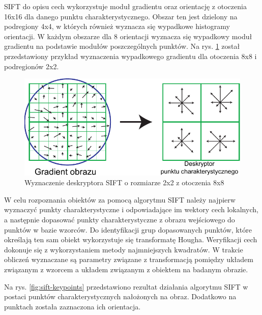 SIFT do opisu cech wykorzystuje moduł gradientu oraz orientację z otoczenia 16x16 dla danego punktu charakterystycznego. Obszar ten jest dzielony na podregiony 4x4, w których również wyznacza się wypadkowe histogramy orientacji. W każdym obszarze dla 8 orientacji wyznacza się wypadkowy moduł gradientu na podstawie modułów poszczególnych punktów. Na rys. \ref{fig:sift-descriptor} został przedstawiony przykład wyznaczenia wypadkowego gradientu dla otoczenia 8x8 i podregionów 2x2.

\begin{figure}[h]
	\centering
	\includegraphics[scale=1]{graphics/01_podstawy_teoretyczne/sift-descriptor.pdf}
	\caption{Wyznaczenie deskryptora SIFT o rozmiarze 2x2 z otoczenia 8x8 \cite{LOWE04}}
	\label{fig:sift-descriptor}
\end{figure}

W celu rozpoznania obiektów za pomocą algorytmu SIFT należy najpierw wyznaczyć punkty charakterystyczne i odpowiadające im wektory cech lokalnych, a następnie dopasować punkty charakterystyczne z obrazu wejściowego do punktów w bazie wzorców. Do identyfikacji grup dopasowanych punktów, które określają ten sam obiekt wykorzystuje się transformatę Hougha. Weryfikacji cech dokonuje się z wykorzystaniem metody najmniejszych kwadratów. W trakcie obliczeń wyznaczane są parametry związane z transformacją pomiędzy układem związanym z wzorcem a układem związanym z obiektem na badanym obrazie.

Na rys. \ref{fig:sift-keypoints} przedstawiono rezultat działania algorytmu SIFT w postaci punktów charakterystycznych nałożonych na obraz. Dodatkowo na punktach została zaznaczona ich orientacja.

